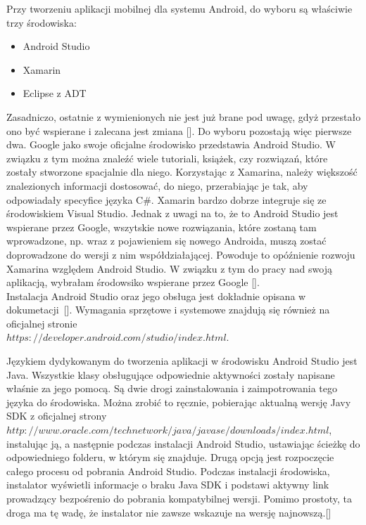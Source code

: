 \documentclass[a4paper,12pt,reqno]{article}
\begin{document}
Przy tworzeniu aplikacji mobilnej dla systemu Android, do wyboru są właściwie trzy środowiska:
\begin{itemize}
	\item Android Studio
	\item Xamarin
	\item Eclipse z ADT
\end{itemize}
Zasadniczo, ostatnie z wymienionych nie jest już brane pod uwagę, gdyż przestało ono być wspierane i zalecana jest zmiana []. Do wyboru pozostają więc pierwsze dwa. Google jako swoje oficjalne środowisko przedstawia Android Studio. W związku z tym można znaleźć wiele tutoriali, książek, czy rozwiązań, które zostały stworzone spacjalnie dla niego. Korzystając z Xamarina, należy większość znalezionych informacji dostosować, do niego, przerabiając je tak, aby odpowiadały specyfice języka C\#. Xamarin bardzo dobrze integruje się ze środowiskiem Visual Studio. Jednak z uwagi na to, że to Android Studio jest wspierane przez Google, wszytskie nowe rozwiązania, które zostaną tam wprowadzone, np. wraz z pojawieniem się nowego Androida, muszą zostać doprowadzone do wersji z nim współdziałającej. Powoduje to opóźnienie rozwoju Xamarina względem Android Studio. W związku z tym do pracy nad swoją aplikacją, wybrałam środowsiko wspierane przez Google [].\\ 

Instalacja Android Studio oraz jego obsługa jest dokładnie opisana w dokumetacji~[]. Wymagania sprzętowe i systemowe znajdują się również na oficjalnej stronie\\ $https://developer.android.com/studio/index.html$.

Językiem dydykowanym do tworzenia aplikacji w środowisku Android Studio jest Java. Wszystkie klasy obsługujące odpowiednie aktywności
zostały napisane właśnie za jego pomocą. Są dwie drogi zainstalowania i zaimpotrowania tego języka do środowiska. Można zrobić to ręcznie, pobierając aktualną wersję Javy SDK z oficjalnej strony $http://www.oracle.com/technetwork/java/javase/downloads/index.html$, instalując ją, a następnie podczas instalacji Android Studio, ustawiając ścieżkę do odpowiedniego folderu, w którym się znajduje. Drugą opcją jest rozpoczęcie całego procesu od pobrania Android Studio. Podczas instalacji środowiska, instalator wyświetli informacje o braku Java SDK i podstawi aktywny link prowadzący bezpośrenio do pobrania kompatybilnej wersji. Pomimo prostoty, ta droga ma tę wadę, że instalator nie zawsze wskazuje na wersję najnowszą.[] \\
\end{document}
